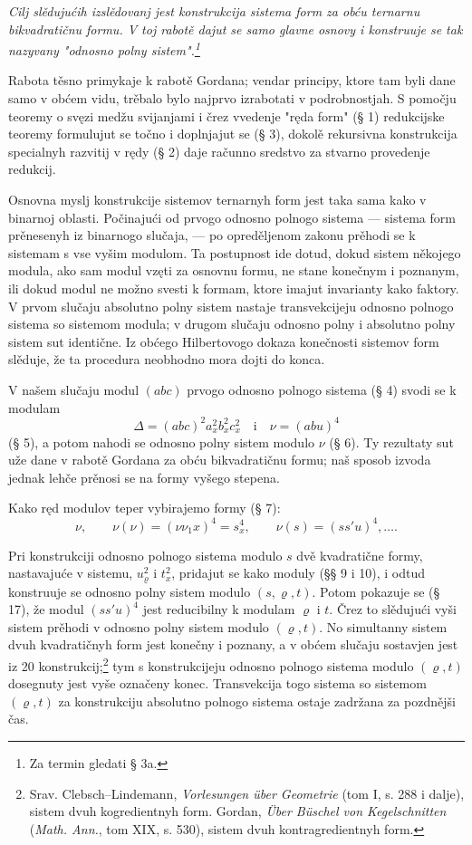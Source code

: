 \documentclass[11pt]{article}
\begin{document}
{\itshape Cilj slědujućih izslědovanj jest konstrukcija sistema form za obću ternarnu bikvadratičnu formu. V toj rabotě dajut se samo glavne osnovy i konstruuje se tak nazyvany "odnosno polny sistem".\footnote{Za termin gledati § 3a.}}

Rabota těsno primykaje k rabotě Gordana; vendar principy, ktore tam byli dane samo v obćem vidu, trěbalo bylo najprvo izrabotati v podrobnostjah. S pomočju teoremy o svęzi medžu svijanjami i črez vvedenje "ręda form" (§ 1) redukcijske teoremy formulujut se točno i doplnjajut se (§ 3), dokolě rekursivna konstrukcija specialnyh razvitij v rędy (§ 2) daje računno sredstvo za stvarno provedenje redukcij.

Osnovna myslj konstrukcije sistemov ternarnyh form jest taka sama kako v binarnoj oblasti. Počinajući od prvogo odnosno polnogo sistema --- sistema form prěnesenyh iz binarnogo slučaja, --- po opreděljenom zakonu prěhodi se k sistemam s vse vyšim modulom. Ta postupnost ide dotud, dokud sistem někojego modula, ako sam modul vzęti za osnovnu formu, ne stane konečnym i poznanym, ili dokud modul ne možno svesti k formam, ktore imajut invarianty kako faktory. V prvom slučaju absolutno polny sistem nastaje transvekcijeju odnosno polnogo sistema so sistemom modula; v drugom slučaju odnosno polny i absolutno polny sistem sut identične. Iz obćego Hilbertovogo dokaza konečnosti sistemov form slěduje, že ta procedura neobhodno mora dojti do konca.

V našem slučaju modul $(abc)$ prvogo odnosno polnogo sistema (§ 4) svodi se k modulam
\[
\Delta=(abc)^2a_x^2b_x^2c_x^2\quad\text{i}\quad \nu=(abu)^4
\]
(§ 5), a potom nahodi se odnosno polny sistem modulo $\nu$ (§ 6). Ty rezultaty sut uže dane v rabotě Gordana za obću bikvadratičnu formu; naš sposob izvoda jednak lehče prěnosi se na formy vyšego stepena.

Kako ręd modulov teper vybirajemo formy (§ 7):
\[
\nu,\qquad \nu(\nu)=(\nu\nu_1x)^4=s_x^4,\qquad \nu(s)=(ss'u)^4,\ldots .
\]

Pri konstrukciji odnosno polnogo sistema modulo $s$ dvě kvadratične formy, nastavajuće v sistemu, $u_\varrho^2$ i $t_x^2$, pridajut se kako moduly (§§ 9 i 10), i odtud konstruuje se odnosno polny sistem modulo $(s,\varrho,t)$. Potom pokazuje se (§ 17), že modul $(ss'u)^4$ jest reducibilny k modulam $\varrho$ i $t$. Črez to slědujući vyši sistem prěhodi v odnosno polny sistem modulo $(\varrho,t)$. No simultanny sistem dvuh kvadratičnyh form jest konečny i poznany, a v obćem slučaju sostavjen jest iz 20 konstrukcij;\footnote{Srav. Clebsch--Lindemann, \emph{Vorlesungen über Geometrie} (tom I, s. 288 i dalje), sistem dvuh kogredientnyh form. Gordan, \emph{Über Büschel von Kegelschnitten} (\emph{Math. Ann.}, tom XIX, s. 530), sistem dvuh kontragredientnyh form.}
tym s konstrukcijeju odnosno polnogo sistema modulo $(\varrho,t)$ dosegnuty jest vyše označeny konec. Transvekcija togo sistema so sistemom $(\varrho,t)$ za konstrukciju absolutno polnogo sistema ostaje zadržana za pozdnějši čas.
\end{document}
